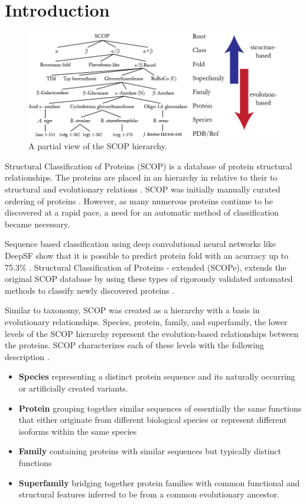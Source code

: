 \documentclass[12pt, a4paper, twocolumn, fullpage]{article}
\theoremstyle{plain}
\theoremstyle{definition}
\theoremstyle{remark}
\begin{document}
\section{Introduction}
\begin{figure}[t]
	\centering
    \includegraphics[width=.8\linewidth]{img/SCOP/scop_hierarchy.png}
    \caption{A partial view of the SCOP hierarchy.}
    \label{}
\end{figure}

Structural Classification of Proteins (SCOP) is a database of protein structural relationships. The proteins are placed in an hierarchy in relative to their to structural and evolutionary relations \cite{scope}. 
SCOP was initially manually curated ordering of proteins \cite{scope}. However, as many numerous proteins continue to be discovered at a rapid pace, a need for an automatic method of classification became necessary.

Sequence based classification using deep convolutional neural networks like DeepSF show that it is possible to predict protein fold with an acurracy up to 75.3\% \cite{deepsf}. Structural Classification of Proteins - extended (SCOPe), extends the original SCOP database by using these types of rigorously validated automated methods to classify newly discovered proteins \cite{scope}. 

Similar to taxonomy, SCOP was created as a hierarchy with a basis in evolutionary relationships. Species, protein, family, and superfamily, the lower levels of the SCOP hierarchy represent the evolution-based relationships between the proteins. SCOP characterizes each of these levels with the following description \cite{scope}.

\begin{itemize}
   \item \textbf{Species} representing a distinct protein sequence and its naturally occurring or artificially created variants.
   \item \textbf{Protein} grouping together similar sequences of essentially the same functions that either originate from different biological species or represent different isoforms within the same species 
   \item \textbf{Family} containing proteins with similar sequences but typically distinct functions
   \item \textbf{Superfamily} bridging together protein families with common functional and structural features inferred to be from a common evolutionary ancestor.
\end{itemize}
\end{document}
